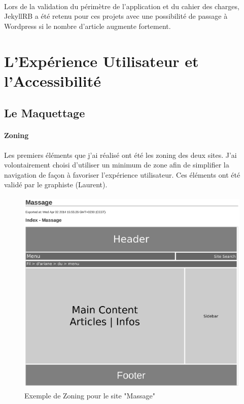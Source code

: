\documentclass[11pt,a4paper,twoside]{report}
\begin{document}
		\paragraph*{}Lors de la validation du périmètre de l'application et du cahier des charges, JekyllRB a été retenu pour ces projets avec une possibilité de passage à Wordpress si le nombre d'article augmente fortement.
		\newpage

	\section{L'Expérience Utilisateur et l'Accessibilité}
		\subsection{Le Maquettage}
			\paragraph*{Zoning}Les premiers éléments que j'ai réalisé ont été les zoning des deux sites. J'ai volontairement choisi d'utiliser un minimum de zone afin de simplifier la navigation de façon à favoriser l'expérience utilisateur. Ces éléments ont été validé par le graphiste (Laurent).
				\begin{figure}[H]
					\centering
					\includegraphics[height=10cm]{Zone-Massage.eps}
					\caption{Exemple de Zoning pour le site "Massage"}
					\label{fig:Zoning Massage}
				\end{figure}
\end{document}
